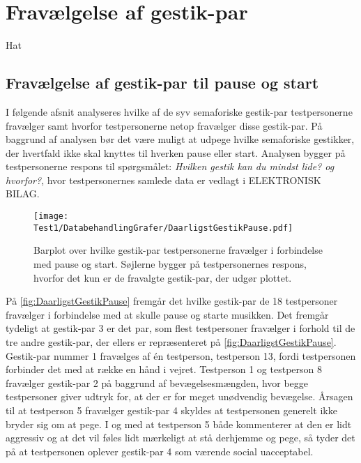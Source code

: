 \chapter{Fravælgelse af gestik-par}
\label{app:TestresultaterFravaelgelse}
%
Hat
%
\section{Fravælgelse af gestik-par til pause og start}
\label{app:TestresultaterPauseDaarlig} 
%
I følgende afsnit analyseres hvilke af de syv semaforiske gestik-par testpersonerne fravælger samt hvorfor testpersonerne netop fravælger disse gestik-par. På baggrund af analysen bør det være muligt at udpege hvilke semaforiske gestikker, der hvertfald ikke skal knyttes til hverken pause eller start. Analysen bygger på testpersonerne respons til spørgsmålet: \textit{Hvilken gestik kan du mindst lide? og hvorfor?}, hvor testpersonernes samlede data er vedlagt i ELEKTRONISK BILAG.
%
\begin{figure}[H]
	\centering
	\texttt{[image: Test1/DatabehandlingGrafer/DaarligstGestikPause.pdf]}
	\caption{Barplot over hvilke gestik-par testpersonerne fravælger i forbindelse med pause og start. Søjlerne bygger på testpersonernes respons, hvorfor det kun er de fravalgte gestik-par, der udgør plottet.}
	\label{fig:DaarligstGestikPause}
\end{figure}
\noindent
% 
På \autoref{fig:DaarligstGestikPause} fremgår det hvilke gestik-par de 18 testpersoner fravælger i forbindelse med at skulle pause og starte musikken. Det fremgår tydeligt at gestik-par 3 er det par, som flest testpersoner fravælger i forhold til de tre andre gestik-par, der ellers er repræsenteret på \autoref{fig:DaarligstGestikPause}. Gestik-par nummer 1 fravælges af én testperson, testperson 13, fordi testpersonen forbinder det med at række en hånd i vejret. Testperson 1 og testperson 8 fravælger gestik-par 2 på baggrund af bevægelsesmængden, hvor begge testpersoner giver udtryk for, at der er for meget unødvendig bevægelse. Årsagen til at testperson 5 fravælger gestik-par 4 skyldes at testpersonen generelt ikke bryder sig om at pege. I og med at testperson 5 både kommenterer at den er lidt aggressiv og at det vil føles lidt mærkeligt at stå derhjemme og pege, så tyder det på at testpersonen oplever gestik-par 4 som værende social uacceptabel. 

